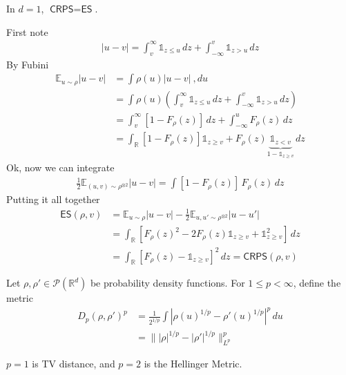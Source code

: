 \documentclass[11pt,fleqn]{article}
\numberwithin{equation}{section}
\theoremstyle{definition}
\theoremstyle{definition}
\renewenvironment{proof}[1][\proofname]{\vspace{-10pt}\begin{replacementproof}}{\end{replacementproof}}
\begin{document}
\begin{theorem}
	In $d = 1$, $\textsf{CRPS} = \textsf{ES}$.
\end{theorem}
\begin{proof}
	 First note
	 \begin{align}
	 	|u-v| = \int_v^\infty \mathds 1_{z \leq u} \, dz + \int_{-\infty}^v \mathds 1_{z > u} \, dz
	 \end{align}
	 By Fubini
	 \begin{align}
	 	\mathbb E_{u \sim \rho}|u-v| & =  \int \rho(u) |u-v|\ , du\\
	 	& = \int \rho(u) \left( \int_v^\infty \mathds 1_{z \leq u} \, dz + \int_{-\infty}^v \mathds 1_{z > u} \, dz \right)\\
	 	& = \int_v^\infty [1 - F_\rho(z)] \, dz + \int_{-\infty}^u F_\rho(z) \, dz\\
	 	& = \int_{\mathbb R} [1-F_\rho(z)] \mathds 1_{z \geq v} + F_\rho(z) \underbrace{\mathds 1_{z < v}}_{1 - \mathds 1_{z \geq v}} \, dz
	 \end{align}
	 Ok, now we can integrate
	 \begin{align}
	 	\frac{1}{2}\mathbb E_{(u,v) \sim \rho^{\otimes 2}} |u-v| = \int [1-F_\rho(z)] \, F_\rho(z) \, dz
	 \end{align}
	 Putting it all together
	 \begin{align}
	 	\textsf{ES}(\rho, v) & = \mathbb E_{u \sim \rho} |u -v| - \frac{1}{2} \mathbb E_{u,u' \sim \rho^{\otimes 2}}  |u - u'|\\
	 	& = \int_{\mathbb R} [F_\rho(z)^2 - 2 F_\rho(z) \mathds 1_{z \geq v} + \mathds 1_{z \geq v}^2] \, dz\\
	 	& = \int_{\mathbb R} [F_\rho(z) - \mathds 1_{z \geq v}]^2 \,dz = \textsf{CRPS}(\rho, v)
	 \end{align}
\end{proof}

\begin{definition}
	Let $\rho, \rho' \in \mathcal P(\mathbb R^d)$ be probability density functions. For $1 \leq p < \infty$, define the metric
	\begin{align}
		D_p(\rho, \rho')^p & = \frac{1}{2^{1/p}} \int |\rho(u)^{1/p} - \rho'(u)^{1/p}|^p \, du\\
		 & = \| |\rho|^{1/p} - |\rho'|^{1/p}\|_{L^p}^p
	\end{align}
\end{definition}
\begin{eg}
	$p=1$ is TV distance, and $p=2$ is the Hellinger Metric.
\end{eg}
\end{document}
